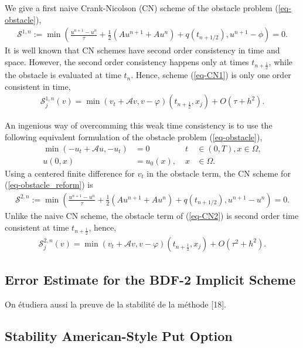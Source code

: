 \documentclass[12pt,a4paper]{article}
\begin{document}
We give a first naive Crank-Nicolson (CN) scheme of the obstacle problem (\ref{eq-obstacle}),
\begin{align}
\mathcal{S}^{1,n} := \min \left( \frac{u^{n+1}-u^n}{\tau} + \frac{1}{2} (Au^{n+1} + Au^{n}) + q(t_{n+1/2}), u^{n+1} - \phi \right) = 0. \label{eq-CN1}
\end{align}
It is well known that CN schemes have second order consistency in time and space. However, the second order consistency happens only at times $t_{n+\frac{1}{2}}$, while the obstacle is evaluated at time $t_n$. Hence, scheme (\ref{eq-CN1}) is only one order consistent in time,
\begin{align*}
\mathcal{S}_j^{1,n} (v) = \min( v_t + \mathcal{A}v, v - \varphi) (t_{n+\frac{1}{2}}, x_j) + O(\tau + h^2).
\end{align*}

An ingenious way of overcomming this weak time consistency is to use the following equivalent formulation of the obstacle problem (\ref{eq-obstacle}),
\begin{align}
	\min( -u_t + \mathcal{A}u, -u_t) &= 0 \; &t &\in (0,T), x \in \Omega, \label{eq-obstacle_reform}\\
	u(0, x) &= u_0(x), \; & x &\in \Omega \nonumber.
\end{align}
Using a centered finite difference for $v_t$ in the obstacle term, the CN scheme for (\ref{eq-obstacle_reform}) is
\begin{align}
\mathcal{S}^{2,n} := \min \left( \frac{u^{n+1}-u^n}{\tau} + \frac{1}{2} (Au^{n+1} + Au^{n}) + q(t_{n+1/2}), u^{n+1} - u^{n} \right) = 0. \label{eq-CN2}
\end{align}
Unlike the naive CN scheme, the obstacle term of (\ref{eq-CN2}) is second order time consistent at time $t_{n+\frac{1}{2}}$, hence,
\begin{align*}
\mathcal{S}_j^{2,n} (v) = \min( v_t + \mathcal{A}v, v - \varphi) (t_{n+\frac{1}{2}}, x_j) + O(\tau^2 + h^2).
\end{align*}

		\subsection{Error Estimate for the BDF-2 Implicit Scheme}

On étudiera aussi la preuve de la stabilité de la méthode [18].

		\subsection{Stability American-Style Put Option}
\end{document}
